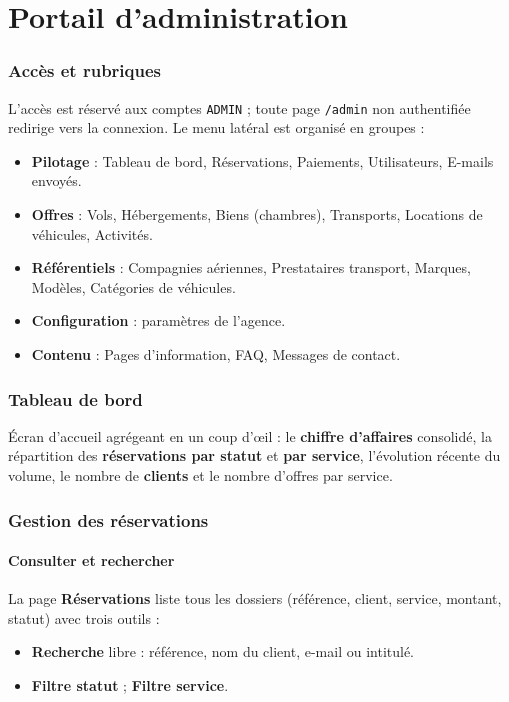 \documentclass[11pt,a4paper]{article}
\newcommand{\etat}[1]{\textcolor{taNavy}{\texttt{#1}}}
\newcommand{\chemin}[1]{\textcolor{taStone}{\texttt{#1}}}
\begin{document}
\part{Portail d'administration}

\section{Accès et rubriques}
L'accès est réservé aux comptes \etat{ADMIN} ; toute page \chemin{/admin} non authentifiée
redirige vers la connexion. Le menu latéral est organisé en groupes :
\begin{itemize}[leftmargin=1.4em]
  \item \textbf{Pilotage} : Tableau de bord, Réservations, Paiements, Utilisateurs, E-mails envoyés.
  \item \textbf{Offres} : Vols, Hébergements, Biens (chambres), Transports, Locations de véhicules, Activités.
  \item \textbf{Référentiels} : Compagnies aériennes, Prestataires transport, Marques, Modèles, Catégories de véhicules.
  \item \textbf{Configuration} : paramètres de l'agence.
  \item \textbf{Contenu} : Pages d'information, FAQ, Messages de contact.
\end{itemize}

\section{Tableau de bord}
Écran d'accueil agrégeant en un coup d'\oe{}il : le \textbf{chiffre d'affaires} consolidé, la
répartition des \textbf{réservations par statut} et \textbf{par service}, l'évolution récente du
volume, le nombre de \textbf{clients} et le nombre d'offres par service.

\section{Gestion des réservations}

\subsection{Consulter et rechercher}
La page \textbf{Réservations} liste tous les dossiers (référence, client, service, montant,
statut) avec trois outils :
\begin{itemize}[leftmargin=1.4em]
  \item \textbf{Recherche} libre : référence, nom du client, e-mail ou intitulé.
  \item \textbf{Filtre statut} ; \textbf{Filtre service}.
\end{itemize}
\end{document}
